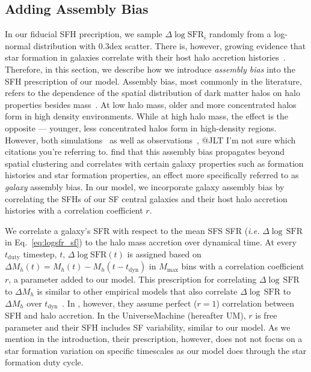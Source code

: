 \documentclass[12pt, letterpaper, preprint, tighten]{aastex62}
\newcommand{\ch}[1]{{\color{orange}{\bf CH:} #1}}
\newcommand{\edt}[1]{{\color{dred}{\bf} #1}}
\newcommand{\logsfr}{\log\mathrm{SFR}}
\begin{document}
\subsection{Adding Assembly Bias} 
\edt{In our fiducial SFH precription, we sample $\Delta \logsfr_i$ randomly 
from a log-normal distribution with $0.3$dex scatter.} 
There is, however, growing evidence that star formation in galaxies correlate with their host 
halo accretion histories~\citep[\emph{e.g.}][]{lim2016, tojeiro2017, tinker2018b}. 
Therefore, in this section, we describe how we introduce \emph{assembly bias} 
into the SFH prescription of our model.%
Assembly bias, most commonly in the literature, refers to the dependence of the 
spatial distribution of dark matter halos on halo properties besides 
mass~\citep{gao2005,wechsler2006,gao2007,wetzel2007,li2008,sunayama2016}.
At low halo mass, older and more concentrated halos form in high density environments. 
While at high halo mass, the effect is the opposite --- younger, less concentrated 
halos form in high-density regions. However, both 
simulations~\citep{croton2007, artale2018, zehavi2018} as well as  
observations~\citep{yang2006,wang2008,tinker2011,wang2013,lacerna2014,calderon2018,tinker2018},
\ch{@JLT I'm not sure which citations you're referring to.} 
find that this assembly bias propagates beyond spatial clustering and correlates
with \edt{certain} galaxy properties such as formation histories and star formation 
properties, an effect more specifically referred to as {\em galaxy} assembly bias. 
In our model, we incorporate galaxy assembly bias by correlating the SFHs 
of our SF central galaxies and their host halo accretion histories 
with a correlation coefficient $r$. 

We correlate a galaxy's SFR with respect to the mean SFS SFR 
(\emph{i.e.} $\Delta\log\,\mathrm{SFR}$ in Eq.~\ref{eq:logsfr_sf}) to the 
halo mass accretion over dynamical time. At every $t_\mathrm{duty}$ timestep, 
$t$, $\Delta\logsfr(t)$ is assigned based on 
$\Delta M_h(t) = M_h(t) - M_h(t - t_\mathrm{dyn})$ in $M_\mathrm{max}$ bins 
with a correlation coefficient $r$, a parameter added to our model. This 
prescription for correlating $\Delta\log\,\mathrm{SFR}$ to $\Delta M_h$ is 
similar to other empirical models that also correlate $\Delta\log\,\mathrm{SFR}$ 
to $\Delta M_h$ over $t_\mathrm{dyn}$~\citep{rodriguez-puebla2016a, behroozi2018}.
In \cite{rodriguez-puebla2016a}, however, they assume perfect ($r=1$) correlation 
between SFH and halo accretion. In the \cite{behroozi2018} {\sc UniverseMachine} 
(hereafter UM), $r$ is free parameter and their SFH includes SF variability, 
similar to our model. As we mention in the introduction, their prescription, 
however, does not not focus on a star formation variation on specific timescales as our model does through 
the star formation duty cycle. 
\end{document}
